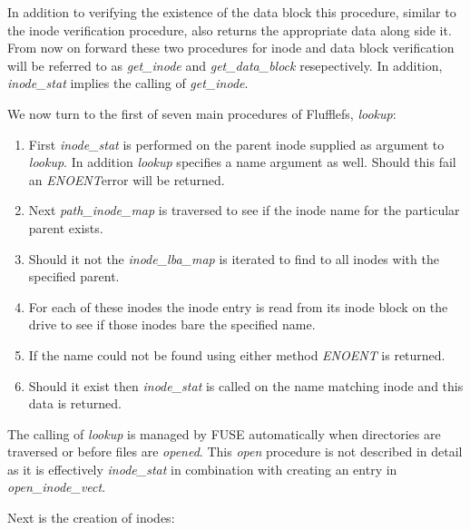 In addition to verifying the existence of the data block this procedure, similar
to the inode verification procedure, also returns the appropriate data along
side it. From now on forward these two procedures for inode and data block
verification will be referred to as \textit{get\_inode} and
\textit{get\_data\_block} resepectively. In addition, \textit{inode\_stat}
implies the calling of \textit{get\_inode}.

We now turn to the first of seven main procedures of Flufflefs, \textit{lookup}:
\begin{enumerate}
    \item First \textit{inode\_stat} is performed on the parent inode supplied
    as argument to \textit{lookup}. In addition \textit{lookup} specifies a name
    argument as well. Should this fail an \textit{ENOENT}\footnotemark[13] error
    will be returned.
    \item Next \textit{path\_inode\_map} is traversed to see if the inode name
    for the particular parent exists.
    \item Should it not the \textit{inode\_lba\_map} is iterated to find to
    all inodes with the specified parent.
    \item For each of these inodes the inode entry is read from its inode block
    on the drive to see if those inodes bare the specified name.
    \item If the name could not be found using either method \textit{ENOENT}
    is returned.
    \item Should it exist then \textit{inode\_stat} is called on the name
    matching inode and this data is returned.
\end{enumerate}


The calling of \textit{lookup} is managed by FUSE automatically when directories
are traversed or before files are \textit{opened}. This \textit{open} procedure
is not described in detail as it is effectively \textit{inode\_stat} in
combination with creating an entry in \textit{open\_inode\_vect}.

Next is the creation of inodes:

